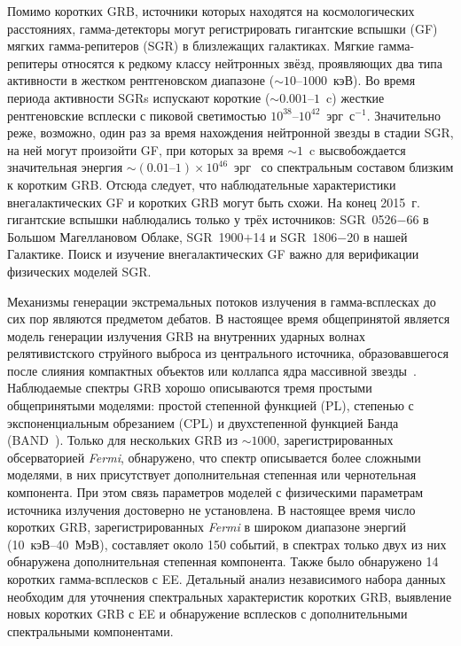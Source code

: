 Помимо коротких GRB, источники которых находятся на космологических расстояниях,
гамма-детекторы могут регистрировать гигантские вспышки (GF) мягких гамма-репитеров (SGR)
в близлежащих галактиках. Мягкие гамма-репитеры относятся 
к редкому классу нейтронных звёзд, проявляющих 
два типа активности в жестком рентгеновском диапазоне ($\sim 10\textrm{--}1000$~кэВ). 
Во время периода активности SGRs испускают короткие ($\sim0.001\textrm{--}1$~c) жесткие рентгеновские всплески 
с пиковой светимостью $10^{38}\textrm{--}10^{42}$~эрг~с$^{-1}$. Значительно реже, 
возможно, один раз за время нахождения нейтронной звезды в стадии SGR, на ней могут произойти GF, 
при которых за время $\sim 1$~c высвобождается значительная 
энергия $\sim(0.01\textrm{--}1)\times 10^{46}$~эрг~\citep{Mereghetti2013} 
со спектральным составом близким к коротким GRB.
Отсюда следует, что наблюдательные характеристики внегалактических GF и коротких GRB могут быть схожи. 
На конец 2015~г. гигантские вспышки наблюдались только у трёх источников: 
SGR~0526$-$66 в Большом Магеллановом Облаке, SGR~1900$+$14 и SGR~1806$-$20 в нашей Галактике.
Поиск и изучение внегалактических GF важно для верификации физических моделей SGR.

Механизмы генерации экстремальных потоков излучения в гамма-всплесках до сих пор 
являются предметом дебатов. В настоящее время общепринятой является модель генерации 
излучения GRB на внутренних ударных волнах релятивистского струйного выброса из 
центрального источника, образовавшегося после слияния компактных 
объектов или коллапса ядра массивной звезды~\citep{Kumar_and_Zhang_2014PhR}.
Наблюдаемые спектры GRB хорошо описываются тремя простыми общепринятыми
моделями: простой степенной функцией (PL), степенью с экспоненциальным обрезанием (CPL) и 
двухстепенной функцией Банда (BAND~\citep{Band_1993ApJ}).
Только для нескольких GRB из $\sim 1000$, зарегистрированных обсерваторией \textit{Fermi}, 
обнаружено, что спектр описывается более сложными моделями, в них присутствует дополнительная
степенная или чернотельная компонента.  
При этом связь параметров моделей с физическими параметрам источника излучения 
достоверно не установлена.  
В настоящее время число коротких GRB, зарегистрированных \textit{Fermi}
в широком диапазоне энергий (10~кэВ--40~МэВ), составляет около 150 событий, 
в спектрах только двух из них обнаружена дополнительная степенная компонента.
Также было обнаружено 14 коротких гамма-всплесков с EE.
Детальный анализ независимого набора данных необходим для уточнения 
спектральных характеристик коротких GRB, выявление новых коротких GRB с EE и 
обнаружение всплесков с дополнительными спектральными компонентами.

